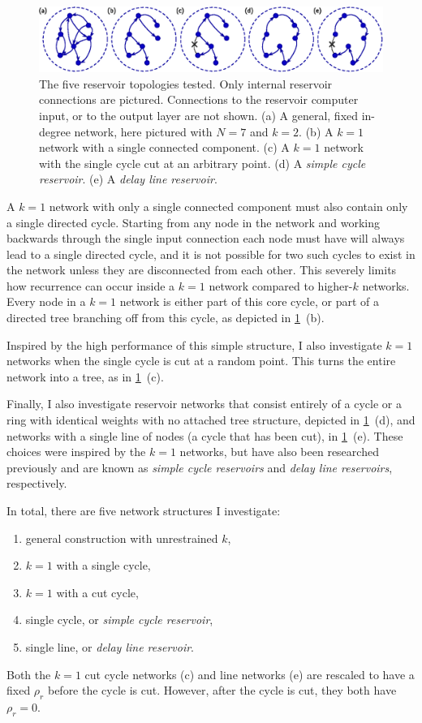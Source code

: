\begin{figure}
  \includegraphics[width=\textwidth]{figures/topology}
  \caption{The five reservoir topologies tested. Only internal
    reservoir connections are pictured. Connections to the reservoir
    computer input, or to the output layer are not shown. (a) A
    general, fixed in-degree network, here pictured with $N=7$ and
    $k=2$. (b) A $k=1$ network with a single connected component. (c)
    A $k=1$ network with the single cycle cut at an arbitrary
    point. (d) A \emph{simple cycle reservoir}. (e) A \emph{delay line
      reservoir}.}%
  \label{fig:topology}
\end{figure}

A $k = 1$ network with only a single connected component must also
contain only a single directed cycle. Starting from any node in the
network and working backwards through the single input connection each
node must have will always lead to a single directed cycle, and it is
not possible for two such cycles to exist in the network unless they
are disconnected from each other. This severely limits how recurrence
can occur inside a $k = 1$ network compared to higher-$k$
networks. Every node in a $k = 1$ network is either part of this core
cycle, or part of a directed tree branching off from this cycle, as
depicted in \cref{fig:topology}~(b).

Inspired by the high performance of this simple structure, I also
investigate $k = 1$ networks when the single cycle is cut at a random
point. This turns the entire network into a tree, as in
\cref{fig:topology}~(c).

Finally, I also investigate reservoir networks that consist entirely
of a cycle or a ring with identical weights with no attached tree
structure, depicted in \cref{fig:topology}~(d), and networks with a
single line of nodes (a cycle that has been cut), in
\cref{fig:topology}~(e). These choices were inspired by the $k = 1$
networks, but have also been researched previously and are known as
\emph{simple cycle reservoirs} and \emph{delay line reservoirs},
respectively.\cite{rodan2011}

In total, there are five network structures I investigate:
\begin{enumerate}[label= (\alph*)]
\item general construction with unrestrained $k$,
\item $k = 1$ with a single cycle,
\item $k = 1$ with a cut cycle,
\item single cycle, or \emph{simple cycle reservoir},
\item single line, or \emph{delay line reservoir}.
\end{enumerate}
Both the $k = 1$ cut cycle networks (c) and line networks (e) are
rescaled to have a fixed $\rho_r$ before the cycle is
cut. However, after the cycle is cut, they both have $\rho_r=0$.

